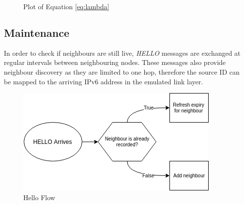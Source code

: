 \documentclass[12pt]{article}
\begin{document}
\begin{figure}[h]
	\centering
	   \caption{Plot of Equation \ref{eq:lambda}}
	\label{fig:lambda}
\end{figure}

\subsection{Maintenance}

In order to check if neighbours are still live, \emph{HELLO} messages are exchanged at regular intervals between neighbouring nodes. These messages also provide neighbour discovery as they are limited to one hop, therefore the source ID can be mapped to the arriving IPv6 address in the emulated link layer. 

\begin{figure}[!ht]
	\centering
	\includegraphics[width=0.6\linewidth]{images/helloflow}
	\caption{Hello Flow}
	\label{fig:helloflow}
\end{figure}
\end{document}
